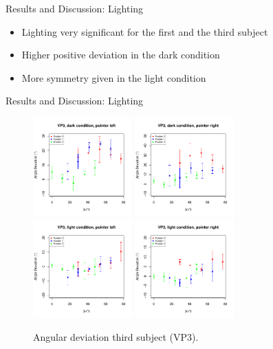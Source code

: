 \documentclass{beamer}
\begin{document}
\begin{frame}{Results and Discussion: Lighting}
    \begin{itemize}
        \item Lighting very significant for the first and the third subject
        \item Higher positive deviation in the dark condition
        \item More symmetry given in the light condition
    \end{itemize}
\end{frame}

\begin{frame}{Results and Discussion: Lighting}
    \begin{minipage}{10cm}
        \begin{figure}
            \centering
            \includegraphics[clip, trim = 0cm 0.5cm 0.5cm 0.6cm, width = 3.8cm]{Images/plots/AngleDevVP3DarkLeft.pdf}
            \includegraphics[clip, trim = 0cm 0.5cm 0.5cm 0.6cm, width = 3.8cm]{Images/plots/AngleDevVP3DarkRight.pdf}
            \includegraphics[clip, trim = 0cm 0.5cm 0.5cm 0.6cm, width = 3.8cm]{Images/plots/AngleDevVP3LightLeft.pdf}
            \includegraphics[clip, trim = 0cm 0.5cm 0.5cm 0.6cm, width = 3.8cm]{Images/plots/AngleDevVP3LightRight.pdf}
            \caption{Angular deviation third subject (VP3).}
            \label{DevVP3}
        \end{figure}
    \end{minipage}
\end{frame}
\end{document}
